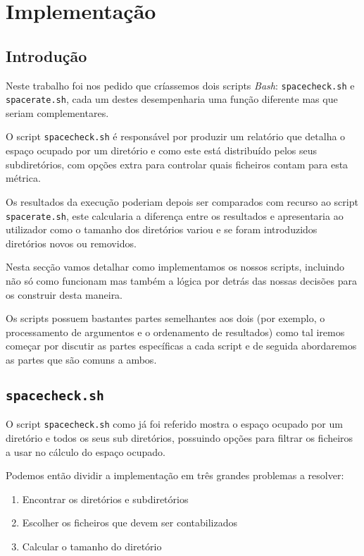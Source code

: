 \chapter{Implementação}

\section{Introdução}

Neste trabalho foi nos pedido que críassemos dois scripts \emph{Bash}:
\Verb|spacecheck.sh| e \Verb|spacerate.sh|, cada um destes desempenharia uma
função diferente mas que seriam complementares.

O script \Verb|spacecheck.sh| é responsável por produzir um relatório que
detalha o espaço ocupado por um diretório e como este está distribuído pelos
seus subdiretórios, com opções extra para controlar quais ficheiros contam para
esta métrica.

Os resultados da execução poderiam depois ser comparados com recurso ao script
\Verb|spacerate.sh|, este calcularia a diferença entre os resultados e
apresentaria ao utilizador como o tamanho dos diretórios variou e se foram
introduzidos diretórios novos ou removidos.

Nesta secção vamos detalhar como implementamos os nossos scripts, incluindo não
só como funcionam mas também a lógica por detrás das nossas decisões para os
construir desta maneira.

Os scripts possuem bastantes partes semelhantes aos dois (por exemplo, o
processamento de argumentos e o ordenamento de resultados) como tal iremos
começar por discutir as partes específicas a cada script e de seguida
abordaremos as partes que são comuns a ambos.

\cprotect\section{\Verb|spacecheck.sh|}

O script \Verb|spacecheck.sh| como já foi referido mostra o espaço ocupado por
um diretório e todos os seus sub diretórios, possuindo opções para filtrar os
ficheiros a usar no cálculo do espaço ocupado.

Podemos então dividir a implementação em três grandes problemas a resolver:

\begin{enumerate}
	\item Encontrar os diretórios e subdiretórios
	\item Escolher os ficheiros que devem ser contabilizados
	\item Calcular o tamanho do diretório
\end{enumerate}

